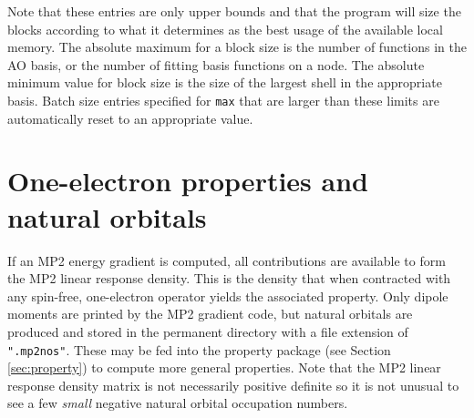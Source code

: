 Note that these entries are only upper bounds and that the program
will size the blocks according to what it determines as the best usage of
the available local memory.  The absolute maximum for a block size is
the number of functions in the AO basis, or the number of fitting basis
functions on a node.  The absolute minimum value for block size is the 
size of the largest shell in the appropriate basis.  Batch size entries 
specified for \verb+max+  that are larger than these limits are 
automatically reset to an appropriate value.


\section{One-electron properties and natural orbitals}

If an MP2 energy gradient is computed, all contributions are available
to form the MP2 linear response density.  This is the density that
when contracted with any spin-free, one-electron operator yields the
associated property.  Only dipole moments are printed by the MP2
gradient code, but natural orbitals are produced and stored in the
permanent directory with a file extension of \verb+".mp2nos"+.  These
may be fed into the property package (see Section \ref{sec:property})
to compute more general properties.  Note that the MP2 linear response
density matrix is not necessarily positive definite so it is not
unusual to see a few {\em small} negative natural orbital occupation
numbers.


